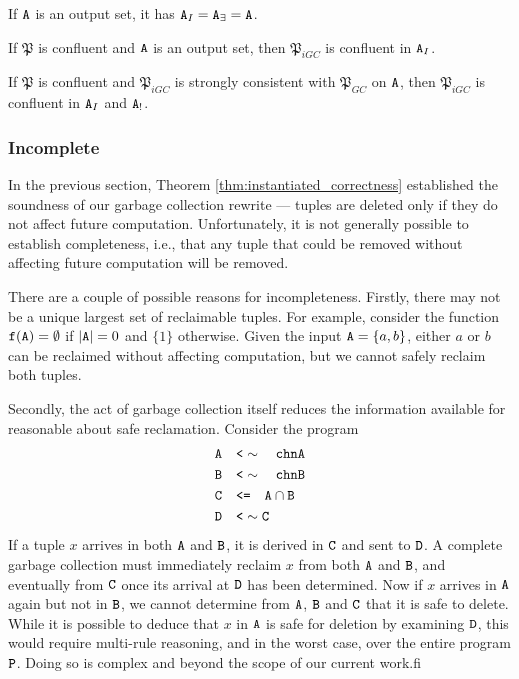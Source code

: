 \begin{cor}
\label{cor:instantiated_equivalence_of_output}
If $\tt{A}$ is an output set, it has $\tt{A}_I = \tt{A}_\exists = \tt{A}$.
\end{cor}

\begin{cor}
\label{cor:instantiated_confluence_of_output}
If $\mathfrak{P}$ is confluent and $\tt{A}$ is an output set, then $\mathfrak{P}_{iGC}$ is confluent in $\tt{A}_I$.
\end{cor}

\begin{cor}
\label{cor:instantiated_confluence_of_keys}
If $\mathfrak{P}$ is confluent and $\mathfrak{P}_{iGC}$ is strongly consistent with $\mathfrak{P}_{GC}$ on $\tt{A}$, then $\mathfrak{P}_{iGC}$ is confluent in $\tt{A}_I$ and $\tt{A}_!$.
\end{cor}

\subsubsection{Incomplete}
In the previous section, Theorem \ref{thm:instantiated_correctness} established the soundness of our garbage collection rewrite --- tuples are deleted only if they do not affect future computation.
Unfortunately, it is not generally possible to establish completeness, i.e., that any tuple that could be removed without affecting future computation will be removed.

There are a couple of possible reasons for incompleteness.
Firstly, there may not be a unique largest set of reclaimable tuples.
For example, consider the function $\tt{f}(\tt{A}) = \emptyset$ if $|\tt{A}| = 0$ and $\{1\}$ otherwise.
Given the input $\tt{A} = \{a,b\}$, either $a$ or $b$ can be reclaimed without affecting computation, but we cannot safely reclaim both tuples.

Secondly, the act of garbage collection itself reduces the information available for reasonable about safe reclamation.
Consider the program
\begin{align*}
\tt{A} &\quad\tt{<}\sim\quad \tt{chnA}\\
\tt{B} &\quad\tt{<}\sim\quad \tt{chnB}\\
\tt{C} &\quad\tt{<=}\quad \tt{A} \cap \tt{B}\\
\tt{D} &\quad\tt{<}\sim \tt{C}
\end{align*}
If a tuple $x$ arrives in both $\tt{A}$ and $\tt{B}$, it is derived in $\tt{C}$ and sent to $\tt{D}$.
A complete garbage collection must immediately reclaim $x$ from both $\tt{A}$ and $\tt{B}$, and eventually from $\tt{C}$ once its arrival at $\tt{D}$ has been determined.
Now if $x$ arrives in $\tt{A}$ again but not in $\tt{B}$, we cannot determine from $\tt{A}$, $\tt{B}$ and $\tt{C}$ that it is safe to delete.
While it is possible to deduce that $x$ in $\tt{A}$ is safe for deletion by examining $\tt{D}$, this would require multi-rule reasoning, and in the worst case, over the entire program $\tt{P}$.
Doing so is complex and beyond the scope of our current work.fi




